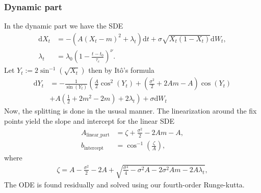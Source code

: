 \subsubsection{Dynamic part}
In the dynamic part we have the SDE
\begin{align}
    \mathrm{d}X_t &= -\left(A(X_t - m)^2 + \lambda_t\right)\mathrm{d}t + \sigma \sqrt{X_t\left(1 - X_t\right)}\mathrm{d}W_t,\\
    \lambda_t &= \lambda_0 \left(1 - \frac{t - t_0}{\tau_c}\right)^\nu.
\end{align}
Let $Y_t := 2 \sin^{-1}\left(\sqrt{X_t}\right)$ then by Itô's formula 
\begin{align}
    \mathrm{d}Y_t &= - \frac{1}{\sin(Y_t)}\left(\frac{A}{2}\cos^2(Y_t) + \left(\frac{\sigma^2}{2} + 2 Am - A\right)\cos(Y_t) \right. \nonumber \\
    &+ \left. A \left(\frac{1}{2} + 2m^2 - 2m\right) + 2\lambda_t\right) + \sigma \mathrm{d}W_t
\end{align}
Now, the splitting is done in the ususal manner. The linearization around the fix points yield the slope and intercept for the linear SDE
\begin{align}
    A_{\mathrm{linear\_part}} &= \zeta + \frac{\sigma^2}{2} - 2 Am - A,\\
    b_{\mathrm{intercept}} &= \cos^{-1}\left(\frac{\zeta}{A}\right),
\end{align}
where 
\begin{align}
    \zeta = A - \frac{\sigma^2}{2} - 2 A + \sqrt{\frac{\sigma^4}{4} - \sigma^2 A - 2 \sigma^2 A m - 2 A \lambda_t},
\end{align}
The ODE is found residually and solved using our fourth-order Runge-kutta.
